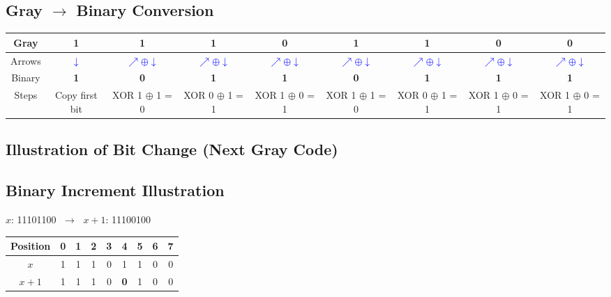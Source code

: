 \subsection*{Gray $\to$ Binary Conversion}

 \begin{center}
\renewcommand{\arraystretch}{1.3}
\begin{tabular}{|c|*8{c|}}
  \hline
    Gray &
    1 &    1 &    1 &    0 &    1 &    1 &    0 &    0  \\
  \hline

  Arrows &
      \textcolor{blue}{$\downarrow$} &
        \textcolor{blue}{$\nearrow \oplus \downarrow$} &        \textcolor{blue}{$\nearrow \oplus \downarrow$} &        \textcolor{blue}{$\nearrow \oplus \downarrow$} &        \textcolor{blue}{$\nearrow \oplus \downarrow$} &        \textcolor{blue}{$\nearrow \oplus \downarrow$} &        \textcolor{blue}{$\nearrow \oplus \downarrow$} &        \textcolor{blue}{$\nearrow \oplus \downarrow$}  \\
  \hline

    Binary &
    \textbf{ 1 } &    \textbf{ 0 } &    \textbf{ 1 } &    \textbf{ 1 } &    \textbf{ 0 } &    \textbf{ 1 } &    \textbf{ 1 } &    \textbf{ 1 }  \\
  \hline

  Steps &
    {\scriptsize Copy first bit } &    {\scriptsize XOR 1 $\oplus$ 1 = 0 } &    {\scriptsize XOR 0 $\oplus$ 1 = 1 } &    {\scriptsize XOR 1 $\oplus$ 0 = 1 } &    {\scriptsize XOR 1 $\oplus$ 1 = 0 } &    {\scriptsize XOR 0 $\oplus$ 1 = 1 } &    {\scriptsize XOR 1 $\oplus$ 0 = 1 } &    {\scriptsize XOR 1 $\oplus$ 0 = 1 }  \\
  \hline
\end{tabular}
\end{center}


\bigskip

\subsection*{Illustration of Bit Change (Next Gray Code)}
\subsection*{Binary Increment Illustration}

$x$: 11101100 $\;\to\;$ $x+1$: 11100100

\begin{tabular}{|c|*8{c|}}
\hline
Position &  0 &  1 &  2 &  3 &  4 &  5 &  6 &  7   \\
\hline
$x$ &  1 &  1 &  1 &  0 &  1 &  1 &  0 &  0   \\
\hline
$x+1$ &     1
&    1
&    1
&    0
&    \cellcolor{yellow}\textbf{ 0 }
&    1
&    0
&    0
 \\
\hline
\end{tabular}

